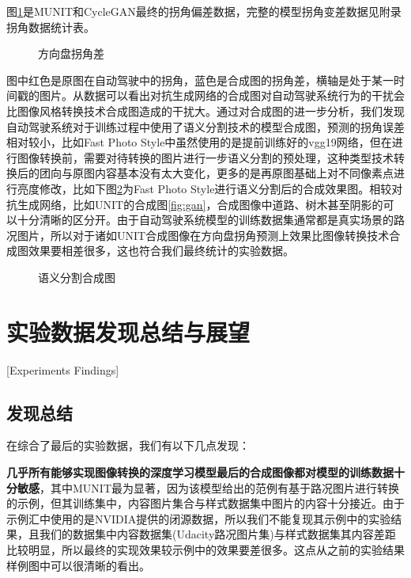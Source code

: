图\ref{fig:sad}是MUNIT和CycleGAN最终的拐角偏差数据，完整的模型拐角变差数据见附录拐角数据统计表。
\begin{figure}[!h]
    \caption{方向盘拐角差}
    \label{fig:sad}
\end{figure}


图中红色是原图在自动驾驶中的拐角，蓝色是合成图的拐角差，横轴是处于某一时间戳的图片。从数据可以看出对抗生成网络的合成图对自动驾驶系统行为的干扰会比图像风格转换技术合成图造成的干扰大。通过对合成图的进一步分析，我们发现自动驾驶系统对于训练过程中使用了语义分割技术的模型合成图，预测的拐角误差相对较小，比如Fast Photo Style中虽然使用的是提前训练好的vgg19网络，但在进行图像转换前，需要对待转换的图片进行一步语义分割的预处理，这种类型技术转换后的团向与原图内容基本没有太大变化，更多的是再原图基础上对不同像素点进行亮度修改，比如下图\ref{fig:seg}为Fast Photo Style进行语义分割后的合成效果图。相较对抗生成网络，比如UNIT的合成图\ref{fig:gan}，合成图像中道路、树木甚至阴影的可以十分清晰的区分开。由于自动驾驶系统模型的训练数据集通常都是真实场景的路况图片，所以对于诸如UNIT合成图像在方向盘拐角预测上效果比图像转换技术合成图效果要相差很多，这也符合我们最终统计的实验数据。

\begin{figure}[h]
    \centering
    \caption{语义分割合成图}
    \label{fig:seg}
\end{figure}


\section{实验数据发现总结与展望}[Experiments Findings]

\subsection{发现总结}

在综合了最后的实验数据，我们有以下几点发现：

\textbf{几乎所有能够实现图像转换的深度学习模型最后的合成图像都对模型的训练数据十分敏感}，其中MUNIT最为显著，因为该模型给出的范例有基于路况图片进行转换的示例，但其训练集中，内容图片集合与样式数据集中图片的内容十分接近。由于示例汇中使用的是NVIDIA提供的闭源数据，所以我们不能复现其示例中的实验结果，且我们的数据集中内容数据集(Udacity路况图片集)与样式数据集其内容差距比较明显，所以最终的实现效果较示例中的效果要差很多。这点从之前的实验结果样例图中可以很清晰的看出。

